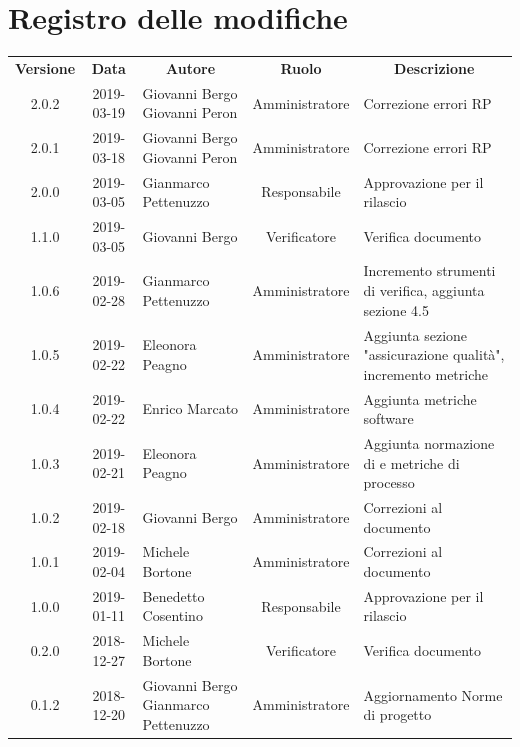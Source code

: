 \documentclass[11pt,a4paper]{article}
\begin{document}
	
	
	{\def\arraystretch{2}\tabcolsep=10pt
	\newpage
	\section*{\centering Registro delle modifiche}
	\begin{tabularx}{\textwidth}{ c | c | p{3.80cm} | c | X }
		\rowcolor{LightBlue}
		\color{white}\bfseries Versione & \color{white}\bfseries Data & \multicolumn{1}{c}{\color{white}\bfseries Autore}
		& \color{white}\bfseries Ruolo & \multicolumn{1}{c}{\color{white}\bfseries Descrizione}\\[0.25cm]
		2.0.2 & 2019-03-19 & Giovanni Bergo \newline Giovanni Peron & Amministratore & Correzione errori RP \\ \hline
		2.0.1 & 2019-03-18 & Giovanni Bergo \newline Giovanni Peron & Amministratore & Correzione errori RP \\ \hline
		2.0.0 & 2019-03-05 & Gianmarco Pettenuzzo & Responsabile & Approvazione per il rilascio \\ \hline
		1.1.0 & 2019-03-05 & Giovanni Bergo & Verificatore & Verifica documento \\ \hline
		1.0.6 & 2019-02-28 & Gianmarco Pettenuzzo & Amministratore & Incremento strumenti di verifica, aggiunta sezione 4.5 \\ \hline
		1.0.5 & 2019-02-22 & Eleonora Peagno & Amministratore & Aggiunta sezione "assicurazione qualità", incremento metriche \\ \hline
		1.0.4 & 2019-02-22 & Enrico Marcato & Amministratore & Aggiunta metriche software \\ \hline
		1.0.3 & 2019-02-21 & Eleonora Peagno & Amministratore & Aggiunta normazione di e metriche di processo \\ \hline
		1.0.2 & 2019-02-18 & Giovanni Bergo & Amministratore & Correzioni al documento \\ \hline
		1.0.1 & 2019-02-04 & Michele Bortone & Amministratore & Correzioni al documento \\ \hline
		1.0.0 & 2019-01-11 & Benedetto Cosentino & Responsabile & Approvazione per il rilascio \\ \hline
		0.2.0 & 2018-12-27 & Michele Bortone & Verificatore & Verifica documento \\ \hline
		0.1.2 & 2018-12-20 & Giovanni Bergo \newline Gianmarco Pettenuzzo & Amministratore & Aggiornamento Norme di progetto \\ \hline

\end{tabularx}}
\end{document}

